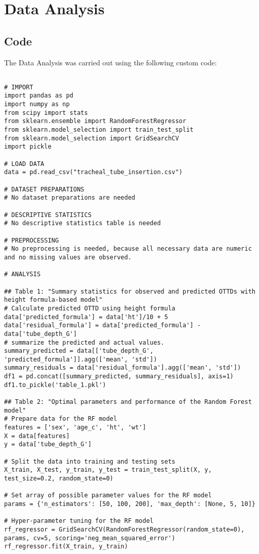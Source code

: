 \documentclass[11pt]{article}
\begin{document}
\section{Data Analysis}
\subsection{{Code}}
The Data Analysis was carried out using the following custom code:

\begin{verbatim}

# IMPORT
import pandas as pd
import numpy as np
from scipy import stats
from sklearn.ensemble import RandomForestRegressor
from sklearn.model_selection import train_test_split
from sklearn.model_selection import GridSearchCV
import pickle

# LOAD DATA
data = pd.read_csv("tracheal_tube_insertion.csv")

# DATASET PREPARATIONS
# No dataset preparations are needed

# DESCRIPTIVE STATISTICS
# No descriptive statistics table is needed

# PREPROCESSING
# No preprocessing is needed, because all necessary data are numeric and no missing values are observed.

# ANALYSIS

## Table 1: "Summary statistics for observed and predicted OTTDs with height formula-based model"
# Calculate predicted OTTD using height formula
data['predicted_formula'] = data['ht']/10 + 5 
data['residual_formula'] = data['predicted_formula'] - data['tube_depth_G']
# summarize the predicted and actual values.
summary_predicted = data[['tube_depth_G', 'predicted_formula']].agg(['mean', 'std'])
summary_residuals = data['residual_formula'].agg(['mean', 'std'])
df1 = pd.concat([summary_predicted, summary_residuals], axis=1)
df1.to_pickle('table_1.pkl')

## Table 2: "Optimal parameters and performance of the Random Forest model"
# Prepare data for the RF model
features = ['sex', 'age_c', 'ht', 'wt']
X = data[features]
y = data['tube_depth_G']

# Split the data into training and testing sets
X_train, X_test, y_train, y_test = train_test_split(X, y, test_size=0.2, random_state=0)

# Set array of possible parameter values for the RF model
params = {'n_estimators': [50, 100, 200], 'max_depth': [None, 5, 10]}

# Hyper-parameter tuning for the RF model
rf_regressor = GridSearchCV(RandomForestRegressor(random_state=0), params, cv=5, scoring='neg_mean_squared_error')
rf_regressor.fit(X_train, y_train)


\end{verbatim}
\end{document}
